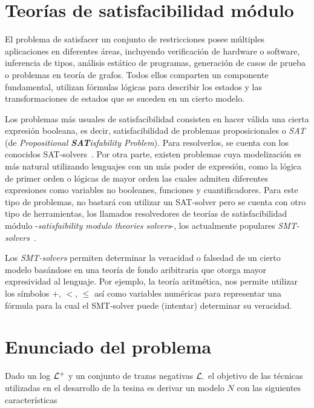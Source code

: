 \section{Teorías de satisfacibilidad módulo}
\label{sec:2.smt}

El problema de satisfacer un conjunto de restricciones posee múltiples aplicaciones
en diferentes áreas, incluyendo verificación de hardware o software, inferencia de 
tipos, análisis estático de programas, generación de casos de prueba o problemas en
teoría de grafos. Todos ellos comparten un componente fundamental, utilizan fórmulas
lógicas para describir los estados y las transformaciones de estados que se suceden
en un cierto modelo.

Los problemas más usuales de satisfacibilidad consisten en hacer válida una cierta 
expresión booleana, es decir, satisfacibilidad de problemas proposicionales 
o \textit{SAT} (de \textit{Propositional \textbf{SAT}isfability Problem}). Para resolverlos,
se cuenta con los conocidos SAT-solvers~\cite{barrettSMT2009}.
Por otra parte, existen problemas cuya modelización es más natural utilizando lenguajes con
un más poder de expresión, como la lógica de primer orden o lógicas de mayor orden las cuales
admiten diferentes expresiones como variables no booleanes, funciones y cuantificadores.
Para este tipo de problemas, no bastará con utilizar un SAT-solver pero se cuenta con
otro tipo de herramientas, los llamados resolvedores de teorías de satisfacibilidad módulo
-\textit{satisfaibility modulo theories solvers}-, los actualmente populares \textit{SMT-solvers}~\cite{deMoura2009}.

Los \textit{SMT-solvers} permiten determinar la veracidad o falsedad de un cierto modelo
basándose en una teoría de fondo aribitraria que otorga mayor expresividad al lenguaje.
Por ejemplo, la teoría aritmética, nos permite utilizar los símbolos  $+$, $<$, $\leq$ 
así como variables numéricas para representar una fórmula para la cual 
el SMT-solver puede (intentar) determinar su veracidad.

\section{Enunciado del problema} 
\label{sec:2.problem}

Dado un log ${\mathcal L}\textsuperscript{+}$ y un conjunto de trazas negativas ${\mathcal L}\textsubscript{-}$ el objetivo de las técnicas utilizadas
en el desarrollo de la tesina es derivar un modelo $N$ con las siguientes características\\

